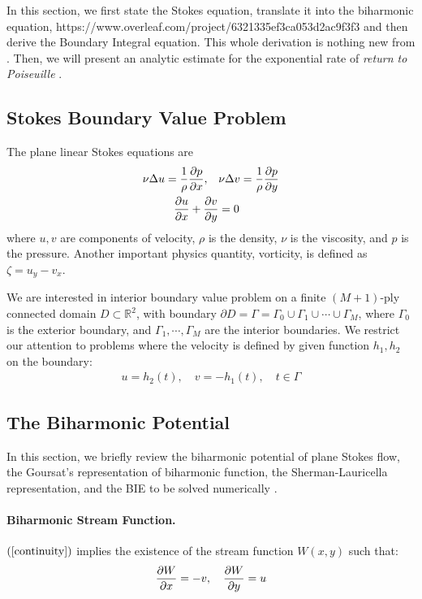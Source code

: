 \documentclass[10pt,twocolumn]{article}
\begin{document}
In this section, we first state the Stokes equation, translate it into the biharmonic equation, https://www.overleaf.com/project/6321335ef3ca053d2ac9f3f3
and then derive the Boundary Integral equation. This whole derivation is nothing new from \cite{greengardIntegralEquationMethods1996}. 
Then, we will present an analytic estimate for the exponential rate of 
\textit{return to Poiseuille} \cite{gregoryTractionBoundaryValue1980}. 

\subsection{Stokes Boundary Value Problem}

The plane linear Stokes equations are
\begin{align}
  \nu \Delta u = \frac 1 \rho \pdv{p}{x},\quad &\nu \Delta v = \frac 1\rho \pdv{p}{y} 
  \label{stokes} \\
  \pdv{u}{x} + \pdv{v}{y} &= 0
  \label{continuity}
\end{align}
where $u,v$ are components of velocity, 
$\rho$ is the density, 
$\nu$ is the viscosity, 
and $p$ is the pressure. 
Another important physics quantity, vorticity, is defined as $\zeta  = u_y - v_x$. 


We are interested in interior boundary value problem on a finite $(M+1)$-ply connected domain $D\subset \mathbb R^2$,
with boundary $\partial D =  \Gamma = \Gamma_0 \cup \Gamma_1 \cup \cdots \cup \Gamma_M$, 
where $\Gamma_0$ is the exterior boundary, and $\Gamma_1,\cdots, \Gamma_M$ are the interior boundaries. We restrict our attention to 
problems where the velocity is defined by given function $h_1,h_2$ on the boundary:
\begin{align}
  u = h_2(t),\quad v = - h_1(t), \quad t\in \Gamma
  \label{bdr-velocity}
\end{align}

\subsection{The Biharmonic Potential}

In this section, 
we briefly review the biharmonic potential of plane Stokes flow, 
the Goursat's representation of biharmonic function, 
the Sherman-Lauricella representation, 
and the BIE to be solved numerically
\cite{ladyzhenskayaMathematicalTheoryViscous1964,greengardIntegralEquationMethods1996}. 

\paragraph*{Biharmonic Stream Function.} $(\ref{continuity})$ implies the existence of the stream function $W(x,y)$ such that:
\begin{align}
  \pdv{W}{x} = -v,\quad \pdv{W}{y} = u \label{stream-1}
\end{align}
\end{document}
